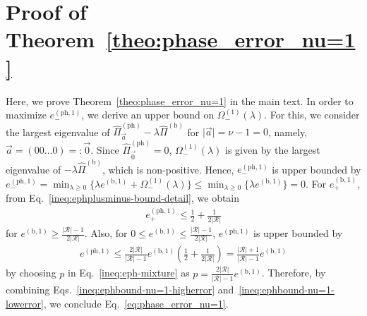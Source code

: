 \documentclass[twocolumn,superscriptaddress,pra,footinbib,notitlepage]{revtex4-1}
\newcommand{\1}{\mbox{1}\hspace{-0.25em}\mbox{l}}
\newcommand{\abs}[1]{\lvert#1\rvert}
\begin{document}
\section{Proof of Theorem~\ref{theo:phase_error_nu=1}}
\label{append:theorem1}
Here, we prove Theorem~\ref{theo:phase_error_nu=1} in the main text. In order to maximize $e_-^{(\textrm{ph}, 1)}$, we derive an upper bound on $\Omega_-^{(1)}{(\lambda)}$. For this, we consider the largest eigenvalue of $\hat{\Pi}_{\vec{a}}^{(\textrm{ph})}-\lambda\hat{\Pi}^{(\textrm{b})}$ for $\abs{\vec{a}}=\nu-1=0$, namely, $\vec{a}=(00\dots0)=:\vec{0}$. Since $\hat{\Pi}_{\vec{0}}^{(\textrm{ph})}=0$, $\Omega_-^{(1)}(\lambda)$ is given by the largest eigenvalue of $-\lambda\hat{\Pi}^{(\textrm{b})}$, which is non-positive. Hence, $e_-^{(\textrm{ph}, 1)}$ is upper bounded by $e_-^{(\textrm{ph}, 1)}=\min_{\lambda\geq0}\{\lambda e^{(\textrm{b}, 1)}+\Omega_-^{(1)}(\lambda)\}\leq\min_{\lambda\geq0}\{\lambda e^{(\textrm{b}, 1)}\}=0$.
For $e_+^{(\textrm{b}, 1)}$, from Eq.~\eqref{ineq:ephplusminus-bound-detail}, we obtain
\begin{align}
e_+^{(\textrm{ph}, 1)}\leq\frac{1}{2}+\frac{1}{2\abs{\mathcal{R}}}\label{ineq:ephbound-nu=1-higherror}
\end{align}
for $e^{(\textrm{b}, 1)}\geq\frac{\abs{\mathcal{R}}-1}{2\abs{\mathcal{R}}}$. Also, for $0\leq e^{(\textrm{b}, 1)}\leq\frac{\abs{\mathcal{R}}-1}{2\abs{\mathcal{R}}}$, $e^{(\textrm{ph}, 1)}$ is upper bounded by
\begin{align}
e^{(\textrm{ph}, 1)}\leq\frac{2\abs{\mathcal{R}}}{\abs{\mathcal{R}}-1}e^{(\textrm{b}, 1)}\left(\frac{1}{2}+\frac{1}{2\abs{\mathcal{R}}}\right)=\frac{\abs{\mathcal{R}}+1}{\abs{\mathcal{R}}-1}e^{(\textrm{b}, 1)}\label{ineq:ephbound-nu=1-lowerror}
\end{align}
by choosing $p$ in Eq.~\eqref{ineq:eph-mixture} as $p=\frac{2\abs{\mathcal{R}}}{\abs{\mathcal{R}}-1}e^{(\textrm{b}, 1)}$. Therefore, by combining Eqs.~\eqref{ineq:ephbound-nu=1-higherror} and~\eqref{ineq:ephbound-nu=1-lowerror}, we conclude Eq.~\eqref{eq:phase_error_nu=1}.

%

\end{document}
